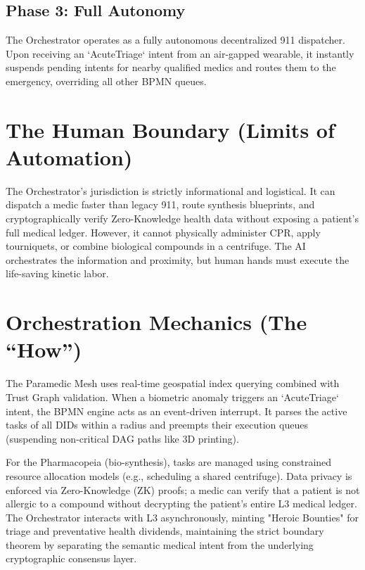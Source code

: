 \subsection{Phase 3: Full Autonomy}
The Orchestrator operates as a fully autonomous decentralized 911 dispatcher. Upon receiving an `AcuteTriage` intent from an air-gapped wearable, it instantly suspends pending intents for nearby qualified medics and routes them to the emergency, overriding all other BPMN queues.

\section{The Human Boundary (Limits of Automation)}
The Orchestrator's jurisdiction is strictly informational and logistical. It can dispatch a medic faster than legacy 911, route synthesis blueprints, and cryptographically verify Zero-Knowledge health data without exposing a patient's full medical ledger. However, it cannot physically administer CPR, apply tourniquets, or combine biological compounds in a centrifuge. The AI orchestrates the information and proximity, but human hands must execute the life-saving kinetic labor. 

\section{Orchestration Mechanics (The ``How'')}
The Paramedic Mesh uses real-time geospatial index querying combined with Trust Graph validation. When a biometric anomaly triggers an `AcuteTriage` intent, the BPMN engine acts as an event-driven interrupt. It parses the active tasks of all DIDs within a radius and preempts their execution queues (suspending non-critical DAG paths like 3D printing). 

For the Pharmacopeia (bio-synthesis), tasks are managed using constrained resource allocation models (e.g., scheduling a shared centrifuge). Data privacy is enforced via Zero-Knowledge (ZK) proofs; a medic can verify that a patient is not allergic to a compound without decrypting the patient's entire L3 medical ledger. The Orchestrator interacts with L3 asynchronously, minting "Heroic Bounties" for triage and preventative health dividends, maintaining the strict boundary theorem by separating the semantic medical intent from the underlying cryptographic consensus layer.
